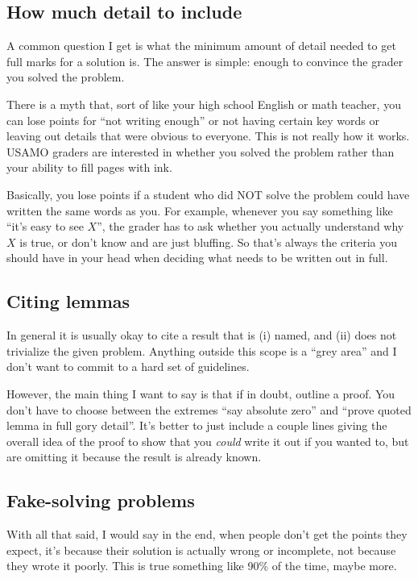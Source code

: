 \documentclass[11pt]{scrartcl}
\begin{document}
\subsection{How much detail to include}
A common question I get is what the minimum amount of detail needed
to get full marks for a solution is.
The answer is simple: enough to convince the grader you solved the problem.

There is a myth that, sort of like your high school English or math teacher,
you can lose points for ``not writing enough'' or not having certain key words
or leaving out details that were obvious to everyone.
This is not really how it works.
USAMO graders are interested in whether you solved the problem
rather than your ability to fill pages with ink.

Basically, \alert{you lose points if a student who did NOT solve the problem
could have written the same words as you}.
For example, whenever you say something like ``it's easy to see $X$'',
the grader has to ask whether you actually understand why $X$ is true,
or don't know and are just bluffing.
So that's always the criteria you should have in your head
when deciding what needs to be written out in full.

\subsection{Citing lemmas}
In general it is usually okay to cite a result that is
(i) named, and (ii) does not trivialize the given problem.
Anything outside this scope is a ``grey area''
and I don't want to commit to a hard set of guidelines.

However, the main thing I want to say is that
\alert{if in doubt, outline a proof}.
You don't have to choose between the extremes
``say absolute zero'' and ``prove quoted lemma in full gory detail''.
It's better to just include a couple lines giving the overall idea of the proof
to show that you \emph{could} write it out if you wanted to,
but are omitting it because the result is already known.

\subsection{Fake-solving problems}
With all that said, I would say in the end,
when \alert{people don't get the points they expect,
it's because their solution is actually wrong or incomplete},
not because they wrote it poorly.
This is true something like 90\% of the time, maybe more.
\end{document}
